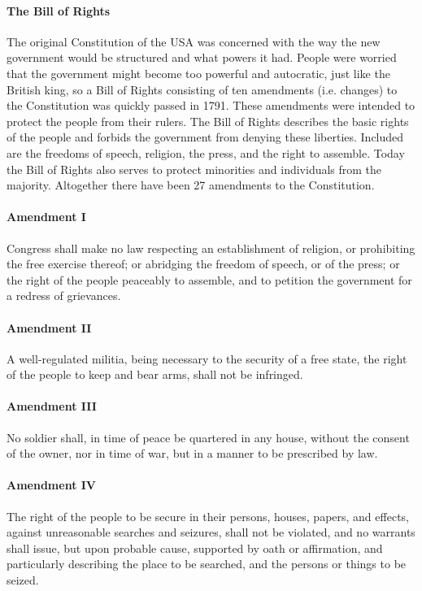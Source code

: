 \documentclass[10pt]{article}
\begin{document}
\paragraph{The Bill of Rights}
The original Constitution of the USA was concerned with the way the new government would be
structured and what powers it had. People were worried that the government might become too
powerful and autocratic, just like the British king, so a Bill of Rights consisting of ten amendments
(i.e. changes) to the Constitution was quickly passed in 1791. These amendments were intended to
protect the people from their rulers. The Bill of Rights describes the basic rights of the people and
forbids the government from denying these liberties. Included are the freedoms of speech, religion,
the press, and the right to assemble. Today the Bill of Rights also serves to protect minorities and
individuals from the majority. Altogether there have been 27 amendments to the Constitution.
\begin{example}
\begin{minipage}{\linewidth}
\paragraph{Amendment I}
Congress shall make no law respecting an establishment of religion, or prohibiting the free exercise thereof; or abridging
the freedom of speech, or of the press; or the right of the people peaceably to assemble, and to petition the government
for a redress of grievances.

\paragraph{Amendment II}
A well-regulated militia, being necessary to the security of a free state, the right of the people to keep and bear arms, shall
not be infringed.

\paragraph{Amendment III}
No soldier shall, in time of peace be quartered in any house, without the consent of the owner, nor in time of war, but in a
manner to be prescribed by law.

\paragraph{Amendment IV}
The right of the people to be secure in their persons, houses, papers, and effects, against unreasonable searches and
seizures, shall not be violated, and no warrants shall issue, but upon probable cause, supported by oath or affirmation, and
particularly describing the place to be searched, and the persons or things to be seized.
\end{minipage}
\end{example}
\end{document}
